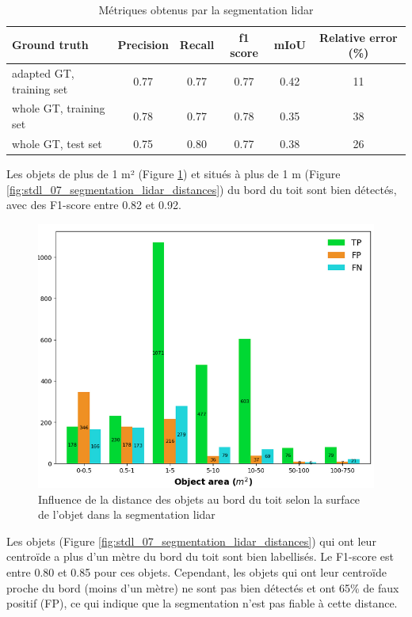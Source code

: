 \begin{table}[H]
    \centering
    \begin{tabular}{|l|c|c|c|c|c|}
    \hline
    Ground truth & Precision & Recall & f1 score & mIoU & Relative error (\%) \\
    \hline
    adapted GT, training set & 0.77 & 0.77 & 0.77 & 0.42 & 11 \\
    whole GT, training set & 0.78 & 0.77 & 0.78 & 0.35 & 38 \\
    whole GT, test set & 0.75 & 0.80 & 0.77 & 0.38 & 26 \\
    \hline
    \end{tabular}
    \caption{Métriques obtenus par la segmentation \gls{lidar}}
    \label{tab:stdl_02_resultats_segmentation_lidar}
\end{table}

\par{Les objets de plus de 1 m² (Figure \ref{fig:stdl_06_segmentation_lidar_surfaces}) et situés à plus de 1 m (Figure \ref{fig:stdl_07_segmentation_lidar_distances}) du bord du toit sont bien détectés, avec des F1-score entre 0.82 et 0.92.}
\begin{figure}[H]
    \centering
    \includegraphics[width=1\linewidth]{02-main//figures/ch2/stdl_06_segmentation_lidar_surfaces.png}
    \caption{Influence de la distance des objets au bord du toit selon la surface de l’objet dans la segmentation \gls{lidar} \cite{herny_detection_2024}}
    \label{fig:stdl_06_segmentation_lidar_surfaces}
\end{figure}
\newpage
\par{Les objets (Figure \ref{fig:stdl_07_segmentation_lidar_distances}) qui ont leur centroïde a plus d'un mètre du bord du toit sont bien labellisés. Le F1-score est entre 0.80 et 0.85 pour ces objets. Cependant, les objets qui ont leur centroïde proche du bord (moins d'un mètre) ne sont pas bien détectés et ont 65\% de faux positif (FP), ce qui indique que la segmentation n'est pas fiable à cette distance.}


